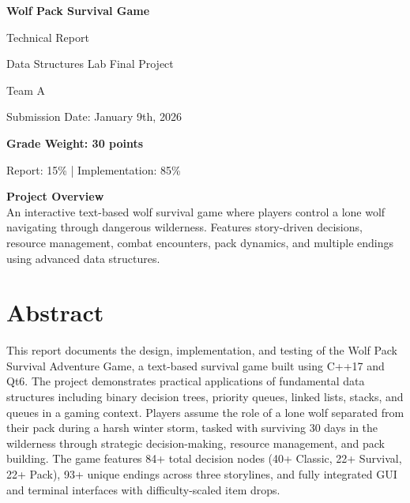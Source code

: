 \documentclass[12pt,a4paper]{article}
\begin{document}
\begin{titlepage}
	\centering
	\vspace*{3cm}

	{\Huge\bfseries Wolf Pack Survival Game \par}
	\vspace{1cm}
	{\LARGE Technical Report \par}
	\vspace{2cm}

	{\Large Data Structures Lab Final Project \par}
	\vspace{1.5cm}

	{\large Team A \par}
	\vspace{0.5cm}
	{\large Submission Date: January 9th, 2026 \par}

	\vfill

	{\large \textbf{Grade Weight: 30 points} \par}
	{\small Report: 15\% | Implementation: 85\% \par}

	\vspace{2cm}

	\textbf{Project Overview}\\
	An interactive text-based wolf survival game where players control a lone wolf navigating through dangerous wilderness. Features story-driven decisions, resource management, combat encounters, pack dynamics, and multiple endings using advanced data structures.

	\vfill

\end{titlepage}

\tableofcontents
\newpage

\section*{Abstract}
This report documents the design, implementation, and testing of the Wolf Pack Survival Adventure Game, a text-based survival game built using C++17 and Qt6. The project demonstrates practical applications of fundamental data structures including binary decision trees, priority queues, linked lists, stacks, and queues in a gaming context. Players assume the role of a lone wolf separated from their pack during a harsh winter storm, tasked with surviving 30 days in the wilderness through strategic decision-making, resource management, and pack building. The game features 84+ total decision nodes (40+ Classic, 22+ Survival, 22+ Pack), 93+ unique endings across three storylines, and fully integrated GUI and terminal interfaces with difficulty-scaled item drops.
\end{document}
